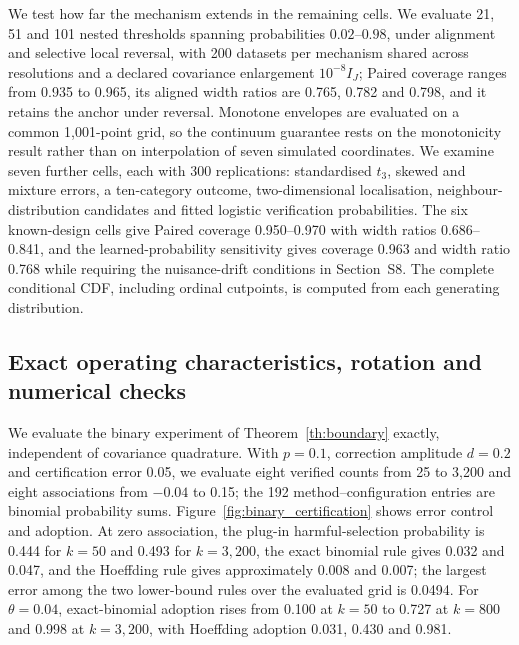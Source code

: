 We test how far the mechanism extends in the remaining cells. We evaluate 21, 51 and 101 nested thresholds spanning probabilities $0.02$--$0.98$, under alignment and selective local reversal, with 200 datasets per mechanism shared across resolutions and a declared covariance enlargement $10^{-8}I_J$; Paired coverage ranges from 0.935 to 0.965, its aligned width ratios are 0.765, 0.782 and 0.798, and it retains the anchor under reversal. Monotone envelopes are evaluated on a common 1,001-point grid, so the continuum guarantee rests on the monotonicity result rather than on interpolation of seven simulated coordinates. We examine seven further cells, each with 300 replications: standardised $t_3$, skewed and mixture errors, a ten-category outcome, two-dimensional localisation, neighbour-distribution candidates and fitted logistic verification probabilities. The six known-design cells give Paired coverage 0.950--0.970 with width ratios 0.686--0.841, and the learned-probability sensitivity gives coverage 0.963 and width ratio 0.768 while requiring the nuisance-drift conditions in Section~S8. The complete conditional CDF, including ordinal cutpoints, is computed from each generating distribution.



\subsection{Exact operating characteristics, rotation and numerical checks}
We evaluate the binary experiment of Theorem~\ref{th:boundary} exactly, independent of covariance quadrature. With $p=0.1$, correction amplitude $d=0.2$ and certification error 0.05, we evaluate eight verified counts from 25 to 3,200 and eight associations from $-0.04$ to 0.15; the 192 method--configuration entries are binomial probability sums. Figure~\ref{fig:binary_certification} shows error control and adoption. At zero association, the plug-in harmful-selection probability is 0.444 for $k=50$ and 0.493 for $k=3,200$, the exact binomial rule gives 0.032 and 0.047, and the Hoeffding rule gives approximately 0.008 and 0.007; the largest error among the two lower-bound rules over the evaluated grid is 0.0494. For $\theta=0.04$, exact-binomial adoption rises from 0.100 at $k=50$ to 0.727 at $k=800$ and 0.998 at $k=3,200$, with Hoeffding adoption 0.031, 0.430 and 0.981.



